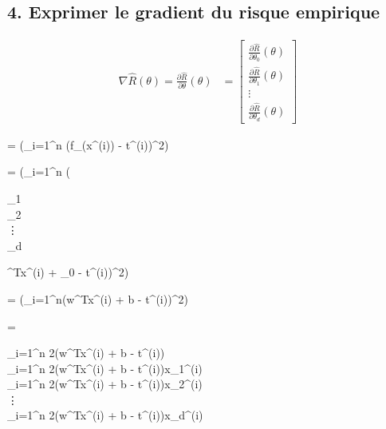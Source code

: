 \documentclass[12pt]{article}
\newenvironment{eqs*}{\begin{equation*}\begin{aligned}}{\end{aligned}\end{equation*}}
\begin{document}
\subsection{4. Exprimer le gradient du risque empirique}
	\begin{align}
	\nabla \hat{R}(\theta) = \frac{\partial\hat{R}}{\partial\theta}(\theta) &= \begin{bmatrix}    														        													\frac{\partial\hat{R}}{\partial\theta_{0}}(\theta) \\
           														\frac{\partial\hat{R}}{\partial\theta_{1}}(\theta) \\
															\vdots \\
           														\frac{\partial\hat{R}}{\partial\theta_{d}}(\theta)
         														\end{bmatrix}
	\end{align}
	
	\begin{eqs*}	
		= \frac{\partial}{\partial\theta} (\sum_{i=1}^{n} (f_{\theta}(x^{(i)}) - t^{(i)})^{2})
	\end{eqs*}

	\begin{eqs*}
		= \frac{\partial}{\partial\theta} (\sum_{i=1}^{n} (\begin{bmatrix}
									\theta_{1} \\
									\theta_{2} \\
									\vdots \\
									\theta_{d}
									\end{bmatrix}^{T}x^{(i)} + \theta_{0} - t^{(i)})^{2})
	\end{eqs*}

	\begin{eqs*}
		= \frac{\partial}{\partial\theta} (\sum_{i=1}^{n}(w^{T}x^{(i)} + b - t^{(i)})^{2})
	\end{eqs*}

	\begin{eqs*}
		=  \begin{bmatrix}
			\sum_{i=1}^{n} 2(w^{T}x^{(i)} + b - t^{(i)}) \\
			\sum_{i=1}^{n} 2(w^{T}x^{(i)} + b - t^{(i)})x_{1}^{(i)} \\
			\sum_{i=1}^{n} 2(w^{T}x^{(i)} + b - t^{(i)})x_{2}^{(i)} \\
			\vdots \\
			\sum_{i=1}^{n} 2(w^{T}x^{(i)} + b - t^{(i)})x_{d}^{(i)}
			\end{bmatrix}
	\end{eqs*}
	
\end{document}
